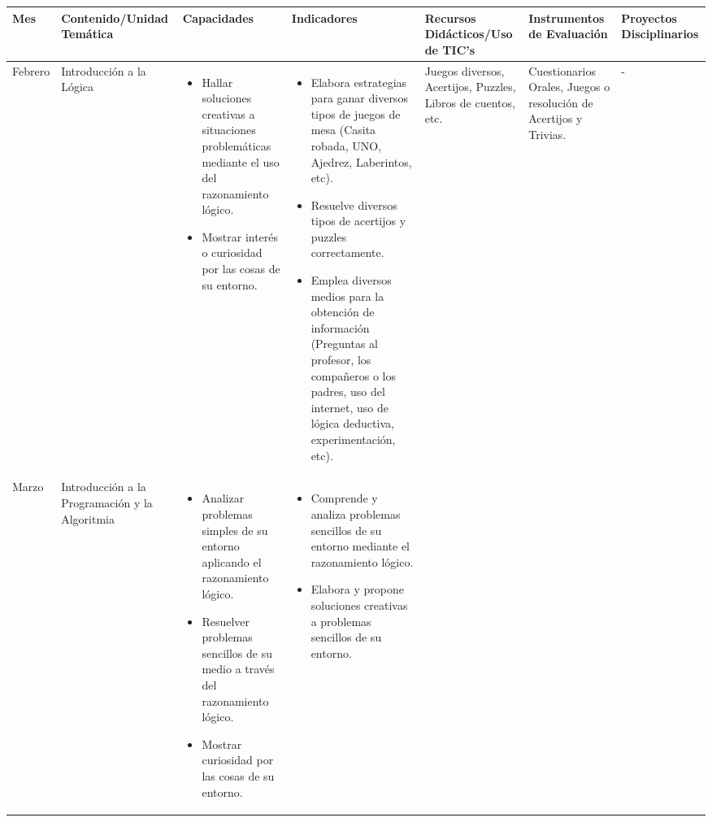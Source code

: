 \documentclass[landscape, a4paper, 10pt]{article}
\newcommand{\smallcellwidth}{0.7in}
\newcommand{\normalcellwidth}{1.2in}
\newcommand{\bigcellwidth}{2.0in}
\begin{document}
	\centering
	\begin{longtable}{|m{\smallcellwidth}|p{\normalcellwidth}|p{\bigcellwidth}|p{\bigcellwidth}|p{\normalcellwidth}|p{\normalcellwidth}|p{\normalcellwidth}|}
		\hline
		\textbf{Mes} &
		\textbf{Contenido/Unidad Temática} &
		\textbf{Capacidades} &
		\textbf{Indicadores} &
		\textbf{Recursos Didácticos/Uso de TIC's} &
		\textbf{Instrumentos de Evaluación} &
		\textbf{Proyectos Disciplinarios} \\
		\hline
		\endhead
		Febrero &
		Introducción a la Lógica &
		\begin{itemize}
			\item Hallar soluciones creativas a situaciones problemáticas mediante el uso del razonamiento lógico.
			\item Mostrar interés o curiosidad por las cosas de su entorno.
		\end{itemize} &
		\begin{itemize}
			\item Elabora estrategias para ganar diversos tipos de juegos de mesa (Casita robada, UNO, Ajedrez, Laberintos, etc).
			\item Resuelve diversos tipos de acertijos y puzzles correctamente.
			\item Emplea diversos medios para la obtención de información (Preguntas al profesor, los compañeros o los padres, uso 
			del internet, uso de lógica deductiva, experimentación, etc).
 		\end{itemize} &
		Juegos diversos, Acertijos, Puzzles, Libros de cuentos, etc. &
		Cuestionarios Orales, Juegos o resolución de Acertijos y Trivias. &
		 - \\
		\hline
		Marzo &
		Introducción a la Programación y la Algoritmia &
		\begin{itemize}
			\item Analizar problemas simples de su entorno aplicando el razonamiento lógico.
			\item Resuelver problemas sencillos de su medio a través del razonamiento lógico.
			\item Mostrar curiosidad por las cosas de su entorno.
		\end{itemize} &
		\begin{itemize}
			\item Comprende y analiza problemas sencillos de su entorno mediante el razonamiento lógico.
			\item Elabora y propone soluciones creativas a problemas sencillos de su entorno.

\end{itemize}
\end{longtable}
\end{document}
